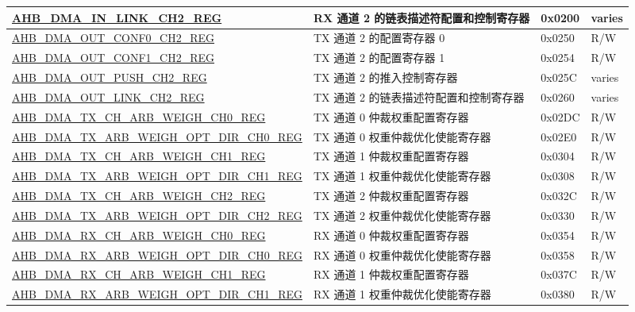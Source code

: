 \begin{longtable}{ | p{8cm} | p{8cm} | p{1.3cm} | p{1.5cm} | }
\hyperref[regdesc:AHBDMAINLINKCHNREG]{AHB\_DMA\_IN\_LINK\_CH2\_REG} & RX 通道 2 的链表描述符配置和控制寄存器 & 0x0200 & varies \\ \hline
\hyperref[regdesc:AHBDMAOUTCONF0CHNREG]{AHB\_DMA\_OUT\_CONF0\_CH2\_REG} & TX 通道 2 的配置寄存器 0 & 0x0250 & R/W \\ \hline
\hyperref[regdesc:AHBDMAOUTCONF1CHNREG]{AHB\_DMA\_OUT\_CONF1\_CH2\_REG} & TX 通道 2 的配置寄存器 1 & 0x0254 & R/W \\ \hline
\hyperref[regdesc:AHBDMAOUTPUSHCHNREG]{AHB\_DMA\_OUT\_PUSH\_CH2\_REG} & TX 通道 2 的推入控制寄存器 & 0x025C & varies \\ \hline
\hyperref[regdesc:AHBDMAOUTLINKCHNREG]{AHB\_DMA\_OUT\_LINK\_CH2\_REG} & TX 通道 2 的链表描述符配置和控制寄存器 & 0x0260 & varies \\ \hline
\hyperref[regdesc:AHBDMATXCHARBWEIGHCHNREG]{AHB\_DMA\_TX\_CH\_ARB\_WEIGH\_CH0\_REG} & TX 通道 0 仲裁权重配置寄存器 & 0x02DC & R/W \\ \hline
\hyperref[regdesc:AHBDMATXARBWEIGHOPTDIRCHNREG]{AHB\_DMA\_TX\_ARB\_WEIGH\_OPT\_DIR\_CH0\_REG} & TX 通道 0 权重仲裁优化使能寄存器 & 0x02E0 & R/W \\ \hline
\hyperref[regdesc:AHBDMATXCHARBWEIGHCHNREG]{AHB\_DMA\_TX\_CH\_ARB\_WEIGH\_CH1\_REG} & TX 通道 1 仲裁权重配置寄存器 & 0x0304 & R/W \\ \hline
\hyperref[regdesc:AHBDMATXARBWEIGHOPTDIRCHNREG]{AHB\_DMA\_TX\_ARB\_WEIGH\_OPT\_DIR\_CH1\_REG} & TX 通道 1 权重仲裁优化使能寄存器 & 0x0308 & R/W \\ \hline
\hyperref[regdesc:AHBDMATXCHARBWEIGHCHNREG]{AHB\_DMA\_TX\_CH\_ARB\_WEIGH\_CH2\_REG} & TX 通道 2 仲裁权重配置寄存器 & 0x032C & R/W \\ \hline
\hyperref[regdesc:AHBDMATXARBWEIGHOPTDIRCHNREG]{AHB\_DMA\_TX\_ARB\_WEIGH\_OPT\_DIR\_CH2\_REG} & TX 通道 2 权重仲裁优化使能寄存器 & 0x0330 & R/W \\ \hline
\hyperref[regdesc:AHBDMARXCHARBWEIGHCHNREG]{AHB\_DMA\_RX\_CH\_ARB\_WEIGH\_CH0\_REG} & RX 通道 0 仲裁权重配置寄存器 & 0x0354 & R/W \\ \hline
\hyperref[regdesc:AHBDMARXARBWEIGHOPTDIRCHNREG]{AHB\_DMA\_RX\_ARB\_WEIGH\_OPT\_DIR\_CH0\_REG} & RX 通道 0 权重仲裁优化使能寄存器 & 0x0358 & R/W \\ \hline
\hyperref[regdesc:AHBDMARXCHARBWEIGHCHNREG]{AHB\_DMA\_RX\_CH\_ARB\_WEIGH\_CH1\_REG} & RX 通道 1 仲裁权重配置寄存器 & 0x037C & R/W \\ \hline
\hyperref[regdesc:AHBDMARXARBWEIGHOPTDIRCHNREG]{AHB\_DMA\_RX\_ARB\_WEIGH\_OPT\_DIR\_CH1\_REG} & RX 通道 1 权重仲裁优化使能寄存器 & 0x0380 & R/W \\ \hline

\end{longtable}

